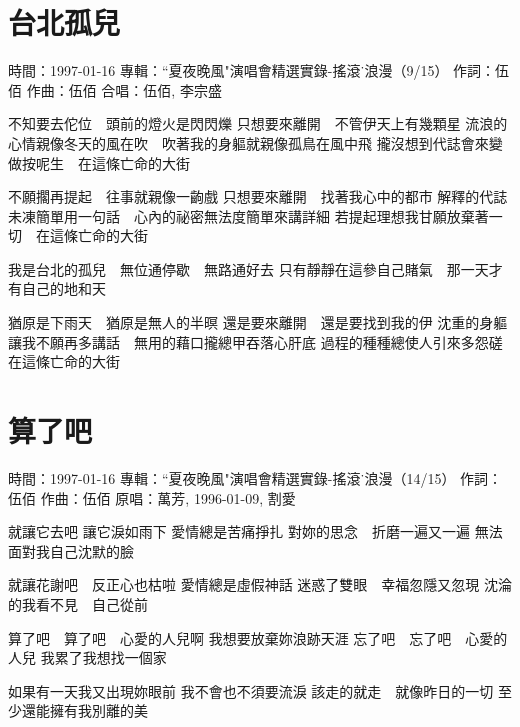 \documentclass[UTF8,a4paper,oneside,twocolumn,12pt]{ctexbook}
\newcommand{\infopair}[2]{\textbullet #1：#2}
\newcommand{\zc}[1][伍佰]{\infopair{作詞}{#1}}
\newcommand{\zq}[1][伍佰]{\infopair{作曲}{#1}}
\newcommand{\zj}[1]{\infopair{專輯}{#1}}
\newcommand{\yc}[1]{\infopair{原唱}{#1}}
\newcommand{\sj}[1]{\infopair{時間}{#1}}
\newenvironment{info}{\begin{flushleft}\kaishu
	}
	{\end{flushleft}\normalsize\yahei\par}
\newenvironment{lyric}{
	}
{}
\begin{document}
\section{台北孤兒}
\begin{info}
	\sj{1997-01-16}
	\zj{``夏夜晚風"演唱會精選實錄-搖滾˙浪漫（9/15）}
	\zc
	\zq
	\infopair{合唱}{伍佰, 李宗盛}
\end{info}
\begin{lyric}
	不知要去佗位　頭前的燈火是閃閃爍
	只想要來離開　不管伊天上有幾顆星
	流浪的心情親像冬天的風在吹　吹著我的身軀就親像孤鳥在風中飛
	攏沒想到代誌會來變做按呢生　在這條亡命的大街

	不願擱再提起　往事就親像一齣戲
	只想要來離開　找著我心中的都市
	解釋的代誌未凍簡單用一句話　心內的祕密無法度簡單來講詳細
	若提起理想我甘願放棄著一切　在這條亡命的大街

	我是台北的孤兒　無位通停歇　無路通好去
	只有靜靜在這參自己賭氣　那一天才有自己的地和天

	猶原是下雨天　猶原是無人的半暝
	還是要來離開　還是要找到我的伊
	沈重的身軀讓我不願再多講話　無用的藉口攏總甲吞落心肝底
	過程的種種總使人引來多怨磋　在這條亡命的大街
\end{lyric}

\section{算了吧}
\begin{info}
	\sj{1997-01-16}
	\zj{``夏夜晚風"演唱會精選實錄-搖滾˙浪漫（14/15）}
	\zc
	\zq
	\yc{萬芳, 1996-01-09, 割愛}
\end{info}
\begin{lyric}
	就讓它去吧 讓它淚如雨下
	愛情總是苦痛掙扎
	對妳的思念　折磨一遍又一遍
	無法面對我自己沈默的臉

	就讓花謝吧　反正心也枯啦
	愛情總是虛假神話
	迷惑了雙眼　幸福忽隱又忽現
	沈淪的我看不見　自己從前

	算了吧　算了吧　心愛的人兒啊
	我想要放棄妳浪跡天涯
	忘了吧　忘了吧　心愛的人兒
	我累了我想找一個家

	如果有一天我又出現妳眼前
	我不會也不須要流淚
	該走的就走　就像昨日的一切
	至少還能擁有我別離的美
\end{lyric}
\end{document}
